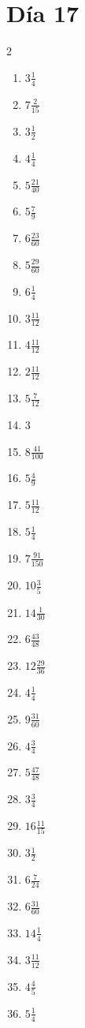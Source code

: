 \documentclass[12pt]{article}
\begin{document}
\section*{Día 17}
\begin{multicols}{2}\begin{enumerate}
\item $ 3 \frac{1}{4} $
\item $ 7 \frac{2}{15} $
\item $ 3 \frac{1}{2} $
\item $ 4 \frac{1}{4} $
\item $ 5 \frac{21}{40} $
\item $ 5 \frac{7}{9} $
\item $ 6 \frac{23}{60} $
\item $ 5 \frac{29}{60} $
\item $ 6 \frac{1}{4} $
\item $ 3 \frac{11}{12} $
\item $ 4 \frac{11}{12} $
\item $ 2 \frac{11}{12} $
\item $ 5 \frac{7}{12} $
\item $ 3 $
\item $ 8 \frac{41}{100} $
\item $ 5 \frac{4}{9} $
\item $ 5 \frac{11}{12} $
\item $ 5 \frac{1}{4} $
\item $ 7 \frac{91}{150} $
\item $ 10 \frac{3}{5} $
\item $ 14 \frac{1}{30} $
\item $ 6 \frac{43}{48} $
\item $ 12 \frac{29}{36} $
\item $ 4 \frac{1}{4} $
\item $ 9 \frac{31}{60} $
\item $ 4 \frac{3}{4} $
\item $ 5 \frac{47}{48} $
\item $ 3 \frac{3}{4} $
\item $ 16 \frac{11}{15} $
\item $ 3 \frac{1}{2} $
\item $ 6 \frac{7}{24} $
\item $ 6 \frac{31}{60} $
\item $ 14 \frac{1}{4} $
\item $ 3 \frac{11}{12} $
\item $ 4 \frac{4}{5} $
\item $ 5 \frac{1}{4} $

\end{enumerate}
\end{multicols}
\end{document}
